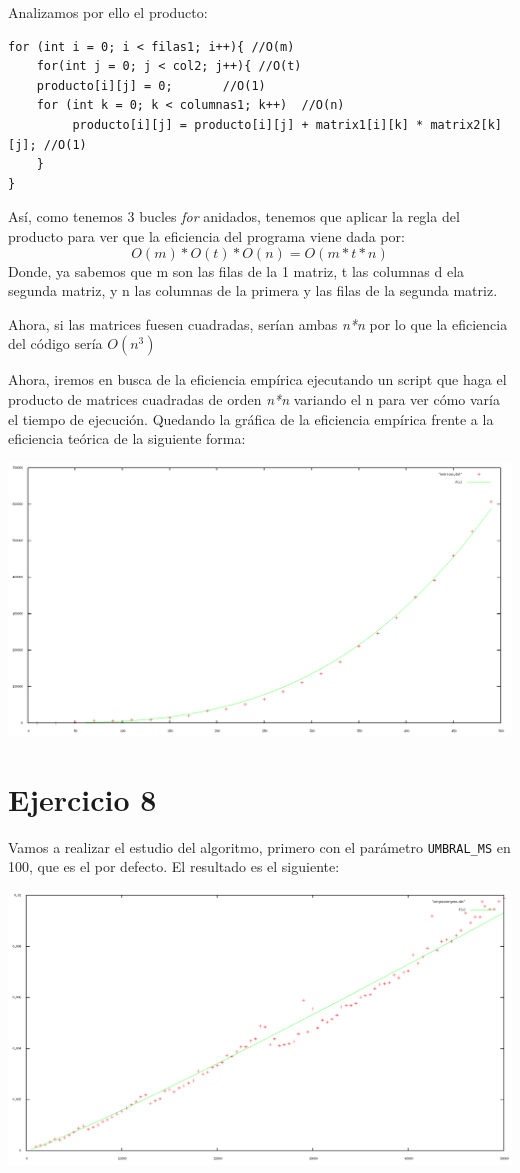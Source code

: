 \documentclass[11pt]{article}
\begin{document}
Analizamos por ello el producto:
\begin{verbatim}
for (int i = 0; i < filas1; i++){ //O(m)
    for(int j = 0; j < col2; j++){ //O(t)
	producto[i][j] = 0;       //O(1)
	for (int k = 0; k < columnas1; k++)  //O(n)
	     producto[i][j] = producto[i][j] + matrix1[i][k] * matrix2[k][j]; //O(1)
    }
}
\end{verbatim}

Así, como tenemos 3 bucles \emph{for} anidados, tenemos que aplicar la regla del producto para ver que la eficiencia del programa viene dada por:
\[
O(m)*O(t)*O(n) = O(m*t*n)
\]
Donde, ya sabemos que m son las filas de la 1 matriz, t las columnas d ela segunda matriz, y n las columnas de la primera y las filas de la segunda matriz.

Ahora, si las matrices fuesen cuadradas, serían ambas \emph{n*n} por lo que la eficiencia del código sería $O(n^3)$

Ahora, iremos en busca de la eficiencia empírica ejecutando un script que haga el producto de matrices cuadradas de orden \emph{n*n} variando el n para ver cómo varía
el tiempo de ejecución. Quedando la gráfica de la eficiencia empírica frente a la eficiencia teórica de la siguiente forma:


\includegraphics[scale=0.25]{matrices}

\section*{Ejercicio 8}
\label{sec-8}
Vamos a realizar el estudio del algoritmo, primero con el parámetro \verb~UMBRAL_MS~ en 100, que es el por defecto.
El resultado es el siguiente:

\includegraphics[scale=0.25]{merge1.png}
\end{document}
